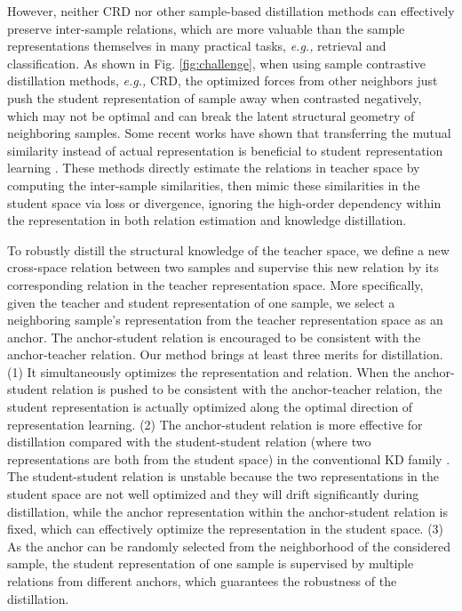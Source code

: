\documentclass[final]{cvpr}
\begin{document}
However, neither CRD nor other sample-based distillation methods can effectively preserve inter-sample relations, which are more valuable than the sample representations themselves in many practical tasks, \emph{e.g.,} retrieval and classification.  As shown in Fig.  \ref{fig:challenge}, 
when using sample contrastive distillation methods, \emph{e.g.,} CRD,
the optimized forces from other neighbors just push the student representation of sample  away when contrasted negatively,
which may not be optimal and can break the latent structural geometry of neighboring samples. 
Some recent works have shown that transferring the mutual similarity instead of actual representation is beneficial to student representation learning \cite{tung2019similarity,park2019relational,peng2019correlation,pkt}. 
These methods directly estimate the relations in teacher space by computing the inter-sample similarities, then mimic these similarities in the student space via  loss or  divergence, ignoring the high-order dependency within the representation in both relation estimation and knowledge distillation.  

To robustly distill the  structural knowledge of the teacher space, we define a new cross-space relation between two samples and supervise this new relation by its corresponding relation in the teacher representation space. More specifically, given the teacher and student representation of one sample, we select  a neighboring sample's representation  from the teacher representation space as an anchor. The anchor-student relation is encouraged to be consistent with the anchor-teacher relation. Our method brings at least three merits for distillation.  
(1) It simultaneously optimizes the representation and relation. When the anchor-student relation is pushed to be consistent with the anchor-teacher relation, the student representation is actually optimized along the optimal direction of representation learning.
(2) The anchor-student relation is more effective for distillation compared with the student-student relation (where two representations are both from the student space) in the conventional KD family \cite{tung2019similarity,park2019relational,peng2019correlation}. The student-student relation is unstable because the two representations in the student space are not well optimized and they will drift significantly during distillation, while the anchor representation within the anchor-student relation is fixed, which can effectively optimize the representation in the student space. 
(3) As the anchor can be randomly selected from the neighborhood of the considered sample, the student representation of one sample is supervised by multiple relations from different anchors, which guarantees the robustness of the distillation. 
\end{document}
